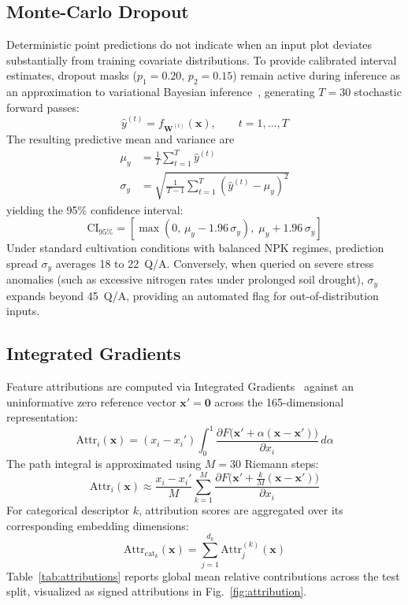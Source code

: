 \documentclass[conference,10pt,letterpaper]{IEEEtran}
\begin{document}
\subsection{Monte-Carlo Dropout}
Deterministic point predictions do not indicate when an input plot deviates substantially from training covariate distributions. To provide calibrated interval estimates, dropout masks ($p_1 = 0.20$, $p_2 = 0.15$) remain active during inference as an approximation to variational Bayesian inference~\cite{gal2016dropout}, generating $T = 30$ stochastic forward passes:
\begin{equation}
\hat{y}^{(t)} = f_{\mathbf{W}^{(t)}}(\mathbf{x}), \qquad t = 1, \dots, T
\end{equation}
The resulting predictive mean and variance are
\begin{align}
\mu_y &= \frac{1}{T} \sum_{t=1}^T \hat{y}^{(t)} \\
\sigma_y &= \sqrt{\frac{1}{T - 1} \sum_{t=1}^T \left(\hat{y}^{(t)} - \mu_y\right)^2}
\end{align}
yielding the 95\% confidence interval:
\begin{equation}
\text{CI}_{95\%} = \left[\max(0,\, \mu_y - 1.96\,\sigma_y),\; \mu_y + 1.96\,\sigma_y\right]
\end{equation}
Under standard cultivation conditions with balanced NPK regimes, prediction spread $\sigma_y$ averages 18 to 22~Q/A. Conversely, when queried on severe stress anomalies (such as excessive nitrogen rates under prolonged soil drought), $\sigma_y$ expands beyond 45~Q/A, providing an automated flag for out-of-distribution inputs.

\subsection{Integrated Gradients}
Feature attributions are computed via Integrated Gradients~\cite{sundararajan2017axiomatic} against an uninformative zero reference vector $\mathbf{x}' = \mathbf{0}$ across the 165-dimensional representation:
\begin{equation}
\text{Attr}_i(\mathbf{x}) = (x_i - x_i') \int_{0}^{1} \frac{\partial F\big(\mathbf{x}' + \alpha(\mathbf{x} - \mathbf{x}')\big)}{\partial x_i}\, d\alpha
\end{equation}
The path integral is approximated using $M = 30$ Riemann steps:
\begin{equation}
\text{Attr}_i(\mathbf{x}) \approx \frac{x_i - x_i'}{M} \sum_{k=1}^M \frac{\partial F\big(\mathbf{x}' + \tfrac{k}{M}(\mathbf{x} - \mathbf{x}')\big)}{\partial x_i}
\end{equation}
For categorical descriptor $k$, attribution scores are aggregated over its corresponding embedding dimensions:
\begin{equation}
\text{Attr}_{\text{cat}_k}(\mathbf{x}) = \sum_{j=1}^{d_k} \text{Attr}_{j}^{(k)}(\mathbf{x})
\end{equation}
Table~\ref{tab:attributions} reports global mean relative contributions across the test split, visualized as signed attributions in Fig.~\ref{fig:attribution}.
\end{document}
